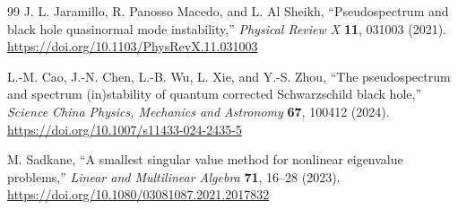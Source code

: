 ﻿\documentclass[12pt,a4paper]{article}
\begin{document}
\begin{thebibliography}{99}
J. L. Jaramillo, R. Panosso Macedo, and L. Al Sheikh,
``Pseudospectrum and black hole quasinormal mode instability,''
\emph{Physical Review X} \textbf{11}, 031003 (2021).
\url{https://doi.org/10.1103/PhysRevX.11.031003}

L.-M. Cao, J.-N. Chen, L.-B. Wu, L. Xie, and Y.-S. Zhou,
``The pseudospectrum and spectrum (in)stability of quantum corrected Schwarzschild black hole,''
\emph{Science China Physics, Mechanics and Astronomy} \textbf{67}, 100412 (2024).
\url{https://doi.org/10.1007/s11433-024-2435-5}

M. Sadkane,
``A smallest singular value method for nonlinear eigenvalue problems,''
\emph{Linear and Multilinear Algebra} \textbf{71}, 16--28 (2023).
\url{https://doi.org/10.1080/03081087.2021.2017832}

\end{thebibliography}
\end{document}
